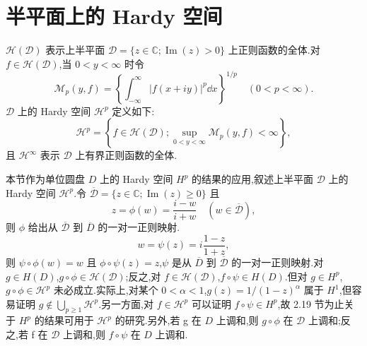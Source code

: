 \section{半平面上的 Hardy 空间}\label{sec:2.20}


$\mathcal{H}(\mathcal{D})$ 表示上半平面 $\mathcal{D} = \{z \in \mathbb{C}; \operatorname{Im}(z) > 0\}$ 上正则函数的全体.对 $f \in \mathcal{H}(\mathcal{D})$,当 $0 < y < \infty$ 时令
\begin{equation*}
\mathcal{M}_{p}(y, f) = \left\{\int_{-\infty}^{\infty}|f(x + iy)|^{p}\dd x\right\}^{1/p} \quad (0 < p < \infty).
\end{equation*}
$\mathcal{D}$ 上的 Hardy 空间 $\mathcal{H}^{p}$ 定义如下:
\begin{equation*}
\mathcal{H}^{p} = \left\{f \in \mathcal{H}(\mathcal{D}); \sup_{0 < y < \infty}\mathcal{M}_{p}(y, f) < \infty \right\},
\end{equation*}
且 $\mathcal{H}^{\infty}$ 表示 $\mathcal{D}$ 上有界正则函数的全体.

本节作为单位圆盘 $D$ 上的 Hardy 空间 $H^{p}$ 的结果的应用,叙述上半平面 $\mathcal{D}$ 上的 Hardy 空间 $\mathcal{H}^{p}$.令 $\overline{\mathcal{D}} = \{z \in \mathbb{C}; \operatorname{Im}(z) \geq 0\}$ 且
\begin{equation*}
z = \phi(w) = \frac{i - w}{i + w} \quad (w \in \overline{\mathcal{D}}),
\end{equation*}
则 $\phi$ 给出从 $\overline{\mathcal{D}}$ 到 $\overline{D}$ 的一对一正则映射.
\begin{equation*}
w = \psi(z) = i\frac{1 - z}{1 + z},
\end{equation*}
则 $\psi \circ \phi(w) = w$ 且 $\phi \circ \psi(z) = z$,$\psi$ 是从 $\overline{D}$ 到 $\overline{\mathcal{D}}$ 的一对一正则映射.对 $g \in H(D)$,$g \circ \phi \in \mathcal{H}(\mathcal{D})$;反之,对 $f \in \mathcal{H}(\mathcal{D})$,$f \circ \psi \in H(D)$.但对 $g \in H^{p}$,$g \circ \phi \in \mathcal{H}^{p}$ 未必成立.实际上,对某个 $0 < \alpha < 1$,$g(z) = 1/(1-z)^{\alpha}$ 属于 $H^{1}$,但容易证明 $g \notin \bigcup_{p \geq 1}\mathcal{H}^{p}$.另一方面,对 $f \in \mathcal{H}^{p}$ 可以证明 $f \circ \psi \in H^{p}$,故 2.19 节为止关于 $H^{p}$ 的结果可用于 $\mathcal{H}^{p}$ 的研究.另外,若 g 在 $D$ 上调和,则 $g \circ \phi$ 在 $\mathcal{D}$ 上调和;反之,若 f 在 $\mathcal{D}$ 上调和,则 $f \circ \psi$ 在 $D$ 上调和.

